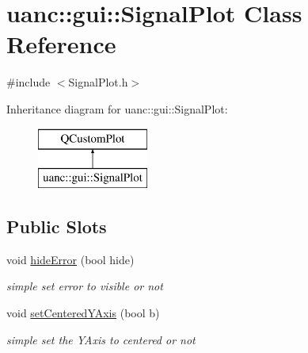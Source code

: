 \hypertarget{classuanc_1_1gui_1_1_signal_plot}{}\section{uanc\+:\+:gui\+:\+:Signal\+Plot Class Reference}
\label{classuanc_1_1gui_1_1_signal_plot}


{\ttfamily \#include $<$Signal\+Plot.\+h$>$}

Inheritance diagram for uanc\+:\+:gui\+:\+:Signal\+Plot\+:\begin{figure}[H]
\begin{center}
\leavevmode
\includegraphics[height=2.000000cm]{classuanc_1_1gui_1_1_signal_plot}
\end{center}
\end{figure}
\subsection*{Public Slots}
\begin{DoxyCompactItemize}
\item 
void \hyperlink{classuanc_1_1gui_1_1_signal_plot_a0475564db8751278d12f1fbbf97328db}{hide\+Error} (bool hide)
\begin{DoxyCompactList}\small\item\em simple set error to visible or not \end{DoxyCompactList}\item 
void \hyperlink{classuanc_1_1gui_1_1_signal_plot_a61480d53076b2778594d19fe2ca984bf}{set\+Centered\+Y\+Axis} (bool b)
\begin{DoxyCompactList}\small\item\em simple set the Y\+Axis to centered or not \end{DoxyCompactList}\end{DoxyCompactItemize}
